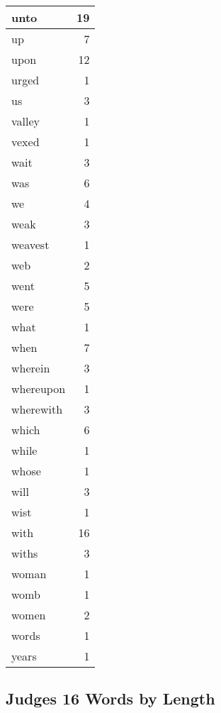 \begin{center}
\begin{longtable}{l|r}
unto & 19\\ \hline 
up & 7\\ \hline 
upon & 12\\ \hline 
urged & 1\\ \hline 
us & 3\\ \hline 
valley & 1\\ \hline 
vexed & 1\\ \hline 
wait & 3\\ \hline 
was & 6\\ \hline 
we & 4\\ \hline 
weak & 3\\ \hline 
weavest & 1\\ \hline 
web & 2\\ \hline 
went & 5\\ \hline 
were & 5\\ \hline 
what & 1\\ \hline 
when & 7\\ \hline 
wherein & 3\\ \hline 
whereupon & 1\\ \hline 
wherewith & 3\\ \hline 
which & 6\\ \hline 
while & 1\\ \hline 
whose & 1\\ \hline 
will & 3\\ \hline 
wist & 1\\ \hline 
with & 16\\ \hline 
withs & 3\\ \hline 
woman & 1\\ \hline 
womb & 1\\ \hline 
women & 2\\ \hline 
words & 1\\ \hline 
years & 1\\ \hline 
\end{longtable}
\end{center}





\subsection{Judges 16 Words by Length}


\normalsize
 
